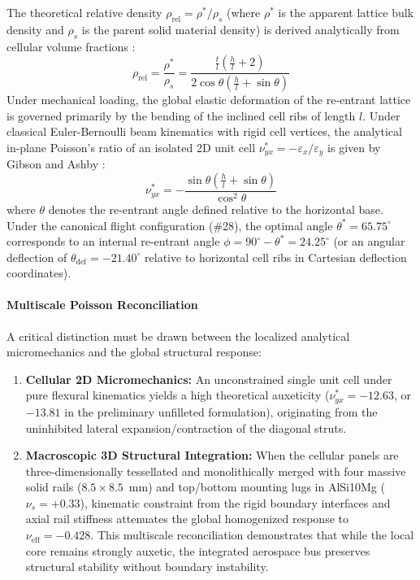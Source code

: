 \documentclass[preprint,12pt,3p]{elsarticle}
\begin{document}
The theoretical relative density $\rho_{\text{rel}} = \rho^* / \rho_s$ (where $\rho^*$ is the apparent lattice bulk density and $\rho_s$ is the parent solid material density) is derived analytically from cellular volume fractions \cite{gibson1997}:
\begin{equation}
  \rho_{\text{rel}} = \frac{\rho^*}{\rho_s} = \frac{\frac{t}{l} \left( \frac{h}{l} + 2 \right)}{2 \cos\theta \left( \frac{h}{l} + \sin\theta \right)}
  \label{eq:relative-density}
\end{equation}
Under mechanical loading, the global elastic deformation of the re-entrant lattice is governed primarily by the bending of the inclined cell ribs of length $l$. Under classical Euler-Bernoulli beam kinematics with rigid cell vertices, the analytical in-plane Poisson's ratio of an isolated 2D unit cell $\nu_{yx}^* = -\varepsilon_x / \varepsilon_y$ is given by Gibson and Ashby \cite{gibson1997}:
\begin{equation}
  \nu_{yx}^* = -\frac{\sin\theta \left( \frac{h}{l} + \sin\theta \right)}{\cos^2\theta}
  \label{eq:poisson-ratio}
\end{equation}
where $\theta$ denotes the re-entrant angle defined relative to the horizontal base. Under the canonical flight configuration (\#28), the optimal angle $\theta^* = 65.75^\circ$ corresponds to an internal re-entrant angle $\phi = 90^\circ - \theta^* = 24.25^\circ$ (or an angular deflection of $\theta_{\text{def}} = -21.40^\circ$ relative to horizontal cell ribs in Cartesian deflection coordinates).

\paragraph{Multiscale Poisson Reconciliation}
A critical distinction must be drawn between the localized analytical micromechanics and the global structural response:
\begin{enumerate}
  \item \textbf{Cellular 2D Micromechanics:} An unconstrained single unit cell under pure flexural kinematics yields a high theoretical auxeticity ($\nu_{yx}^* = -12.63$, or $-13.81$ in the preliminary unfilleted formulation), originating from the uninhibited lateral expansion/contraction of the diagonal struts.
  \item \textbf{Macroscopic 3D Structural Integration:} When the cellular panels are three-dimensionally tessellated and monolithically merged with four massive solid rails ($8.5 \times 8.5$~mm) and top/bottom mounting lugs in AlSi10Mg ($\nu_s = +0.33$), kinematic constraint from the rigid boundary interfaces and axial rail stiffness attenuates the global homogenized response to $\nu_{\text{eff}} = -0.428$. This multiscale reconciliation demonstrates that while the local core remains strongly auxetic, the integrated aerospace bus preserves structural stability without boundary instability.
\end{enumerate}
\end{document}
